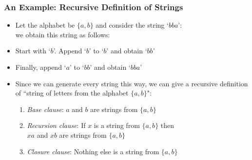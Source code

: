  \begin{frame}
\frametitle{An Example: Recursive Definition of Strings}

\begin{itemize}[<+->]
\item Let the alphabet be $\{a, b\}$ and consider the string `$bba$': \\ we obtain this string as follows:

\bi
 \item Start with `$b$'.  Append `$b$' to `$b$' and obtain `$bb$'  
 
 \item Finally, append `$a$' to `$bb$' and obtain `$bba$'
 
 \ei

\item Since we can generate every string this way, we can give a recursive definition of ``string of letters from the alphabet $\{a, b\}$":

\begin{enumerate}
\item {\emph{Base clause}}: $a$ and $b$ are strings from $\{a, b\}$

\item {\emph{Recursion clause}}: If $x$ is a string from $\{a, b\}$ then \\ \phantom{Recursion clausev} $xa$ and $xb$ are strings from $\{a, b\}$

\item {\emph{Closure clause}}: Nothing else is a string from $\{a, b\}$
\end{enumerate}
\end{itemize} 

\end{frame}



